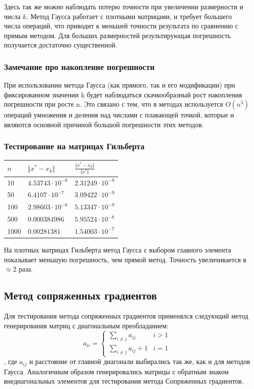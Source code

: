 \documentclass[english]{article}
\begin{document}
Здесь так же можно наблюдать потерю точности при увеличении размерности
и числа \(k\). Метод Гаусса работает с плотными матрицами, и требует
большего числа операций, что приводит к меньшей точности результата по
сравнению с прямым методом. Для больших размерностей результирующая
погрешность получается достаточно существенной.

\subsubsection{Замечание про накопление погрешности}

При использовании метода Гаусса (как прямого, так и его модификации) при фиксированном значении k будет наблюдаться скачкообразный рост накопления погрешности при росте n. Это связано с тем, что в методах используется \(O(n^3)\) операций умножения и деления над числами с плавающей точкой, которые и являются основной причиной большой погрешности этих методов.

\subsubsection{Тестирование на матрицах Гильберта}
\begin{center}
  \begin{longtable}{l|l|l}
    \(n\) & \(\Vert x^* - x_k \Vert\) & \(\frac{\Vert x^* - x_k \Vert}{\Vert x^* \Vert}\) \\
    \hline
    10 & \(4.53743\cdot 10^{-8}\) & \(2.31249\cdot 10^{-9}\) \\
    50 & \(6.4107\cdot 10^{-7} \) & \(3.09422\cdot 10^{-9}\) \\
    100 & \(2.98603\cdot 10^{-6}\) & \(5.13347\cdot 10^{-9}\) \\
    500 & \(0.000384986\) & \(5.95524\cdot 10^{-8}\) \\
    1000 & \(0.00281381 \) & \(1.54003\cdot 10^{-7}\)
  \end{longtable}
\end{center}

На плотных матрицах Гильберта метод Гаусса с выбором главного элемента
показывает меньшую погрешность, чем прямой метод. Точность
увеличивается в \(\approx 2\) раза.

\subsection{Метод сопряженных градиентов}
Для тестирования метода сопряженных градиентов применялся следующий
метод генерирования матриц с диагональным преобладанием:
\[ a_{ii} = \begin{cases}
  \sum\limits_{i \neq j} a_{ij} & i > 1 \\
  \sum\limits_{i \neq j} a_{ij} + 1 & i = 1
\end{cases} \]
, где \(a_{ij}\) и расстояние от главной диагонали выбирались так же,
как и для методов Гаусса. Аналогичным образом генерировались матрицы с
обратным знаком внедиагональных элементов для тестирования метода
Сопряженных градиентов.
\end{document}
